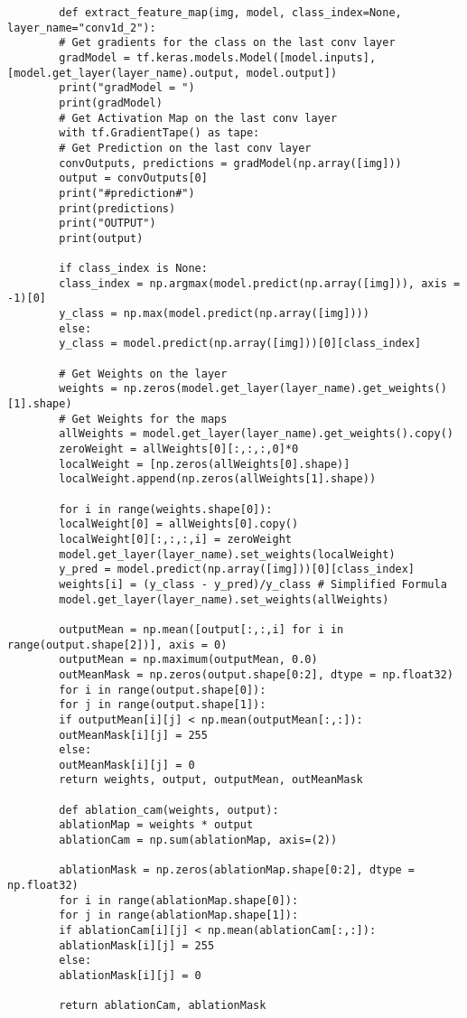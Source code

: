 \documentclass[conference]{IEEEtran}
\begin{document}
	\begin{lstlisting}
		def extract_feature_map(img, model, class_index=None, layer_name="conv1d_2"):
		# Get gradients for the class on the last conv layer
		gradModel = tf.keras.models.Model([model.inputs],[model.get_layer(layer_name).output, model.output])
		print("gradModel = ")
		print(gradModel)
		# Get Activation Map on the last conv layer
		with tf.GradientTape() as tape:
		# Get Prediction on the last conv layer
		convOutputs, predictions = gradModel(np.array([img]))
		output = convOutputs[0]
		print("#prediction#")
		print(predictions)
		print("OUTPUT")
		print(output)
		
		if class_index is None:
		class_index = np.argmax(model.predict(np.array([img])), axis = -1)[0]
		y_class = np.max(model.predict(np.array([img])))
		else:
		y_class = model.predict(np.array([img]))[0][class_index]
		
		# Get Weights on the layer
		weights = np.zeros(model.get_layer(layer_name).get_weights()[1].shape)
		# Get Weights for the maps
		allWeights = model.get_layer(layer_name).get_weights().copy()
		zeroWeight = allWeights[0][:,:,:,0]*0
		localWeight = [np.zeros(allWeights[0].shape)]
		localWeight.append(np.zeros(allWeights[1].shape))
		
		for i in range(weights.shape[0]):
		localWeight[0] = allWeights[0].copy()
		localWeight[0][:,:,:,i] = zeroWeight
		model.get_layer(layer_name).set_weights(localWeight)
		y_pred = model.predict(np.array([img]))[0][class_index]
		weights[i] = (y_class - y_pred)/y_class # Simplified Formula
		model.get_layer(layer_name).set_weights(allWeights)
		
		outputMean = np.mean([output[:,:,i] for i in range(output.shape[2])], axis = 0)
		outputMean = np.maximum(outputMean, 0.0)
		outMeanMask = np.zeros(output.shape[0:2], dtype = np.float32)
		for i in range(output.shape[0]):
		for j in range(output.shape[1]):
		if outputMean[i][j] < np.mean(outputMean[:,:]):
		outMeanMask[i][j] = 255
		else:
		outMeanMask[i][j] = 0
		return weights, output, outputMean, outMeanMask
		
		def ablation_cam(weights, output):
		ablationMap = weights * output
		ablationCam = np.sum(ablationMap, axis=(2))
		
		ablationMask = np.zeros(ablationMap.shape[0:2], dtype = np.float32)
		for i in range(ablationMap.shape[0]):
		for j in range(ablationMap.shape[1]):
		if ablationCam[i][j] < np.mean(ablationCam[:,:]):
		ablationMask[i][j] = 255
		else:
		ablationMask[i][j] = 0
		
		return ablationCam, ablationMask
	\end{lstlisting}
	
\end{document}
